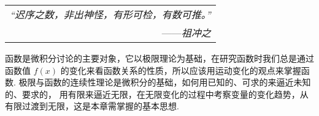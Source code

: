 \begin{flushright}
    \begin{tabular}{r|}
        \textit{“迟序之数，非出神怪，有形可检，有数可推。”}\\
        ——\textit{祖冲之}
    \end{tabular}
\end{flushright}

函数是微积分讨论的主要对象，它以极限理论为基础，在研究函数时我们总是通过函数值 $f(x)$
的变化来看函数关系的性质，所以应该用运动变化的观点来掌握函数.
极限与函数的连续性理论是微积分的基础，如何用已知的、可求的来逼近未知的、要求的，
用有限来逼近无限，在无限变化的过程中考察变量的变化趋势，从有限过渡到无限，这是本章需掌握的基本思想.